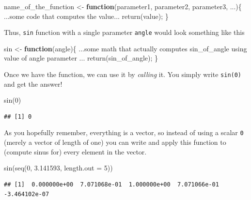 \documentclass[
]{book}
\newenvironment{Shaded}{\begin{snugshade}}{\end{snugshade}}
\newcommand{\AttributeTok}[1]{\textcolor[rgb]{0.77,0.63,0.00}{#1}}
\newcommand{\ControlFlowTok}[1]{\textcolor[rgb]{0.13,0.29,0.53}{\textbf{#1}}}
\newcommand{\DecValTok}[1]{\textcolor[rgb]{0.00,0.00,0.81}{#1}}
\newcommand{\FloatTok}[1]{\textcolor[rgb]{0.00,0.00,0.81}{#1}}
\newcommand{\FunctionTok}[1]{\textcolor[rgb]{0.00,0.00,0.00}{#1}}
\newcommand{\NormalTok}[1]{#1}
\newcommand{\OtherTok}[1]{\textcolor[rgb]{0.56,0.35,0.01}{#1}}
\begin{document}
\begin{Shaded}
\begin{Highlighting}[]
\NormalTok{name\_of\_the\_function }\OtherTok{\textless{}{-}} \ControlFlowTok{function}\NormalTok{(parameter1, parameter2, parameter3, ...)\{}
\NormalTok{  ...some code that computes the value...}
  \FunctionTok{return}\NormalTok{(value);}
\NormalTok{\}}
\end{Highlighting}
\end{Shaded}

Thus, \texttt{sin} function with a single parameter \texttt{angle} would look something like this

\begin{Shaded}
\begin{Highlighting}[]
\NormalTok{sin }\OtherTok{\textless{}{-}} \ControlFlowTok{function}\NormalTok{(angle)\{}
\NormalTok{  ...some math that actually computes sin\_of\_angle using value of angle parameter ...}
  \FunctionTok{return}\NormalTok{(sin\_of\_angle);}
\NormalTok{\}}
\end{Highlighting}
\end{Shaded}

Once we have the function, we can use it by \emph{calling} it. You simply write \texttt{sin(0)} and get the answer!

\begin{Shaded}
\begin{Highlighting}[]
\FunctionTok{sin}\NormalTok{(}\DecValTok{0}\NormalTok{)}
\end{Highlighting}
\end{Shaded}

\begin{verbatim}
## [1] 0
\end{verbatim}

As you hopefully remember, everything is a vector, so instead of using a scalar \texttt{0} (merely a vector of length of one) you can write and apply this function to (compute sinus for) every element in the vector.

\begin{Shaded}
\begin{Highlighting}[]
\FunctionTok{sin}\NormalTok{(}\FunctionTok{seq}\NormalTok{(}\DecValTok{0}\NormalTok{, }\FloatTok{3.141593}\NormalTok{, }\AttributeTok{length.out =} \DecValTok{5}\NormalTok{))}
\end{Highlighting}
\end{Shaded}

\begin{verbatim}
## [1]  0.000000e+00  7.071068e-01  1.000000e+00  7.071066e-01 -3.464102e-07
\end{verbatim}
\end{document}
